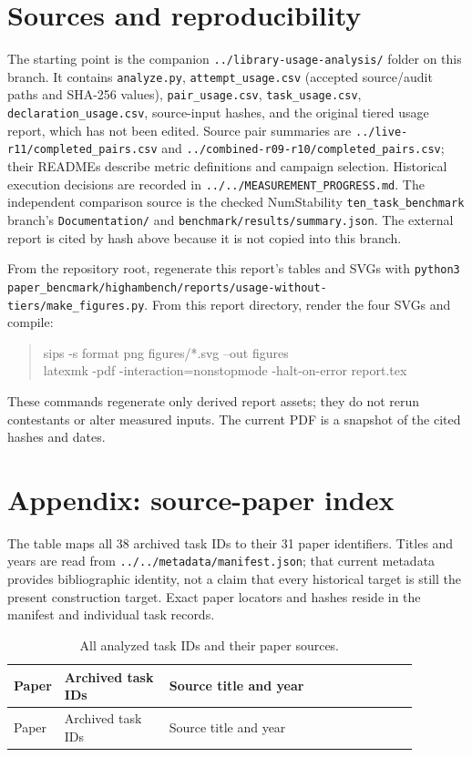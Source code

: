 \documentclass[10pt]{article}
\renewcommand{\arraystretch}{1.12}
\newcommand{\pathref}[1]{\nolinkurl{#1}}
\begin{document}
\section{Sources and reproducibility}
The starting point is the companion \pathref{../library-usage-analysis/} folder on this branch. It contains \pathref{analyze.py}, \pathref{attempt_usage.csv} (accepted source/audit paths and SHA-256 values), \pathref{pair_usage.csv}, \pathref{task_usage.csv}, \pathref{declaration_usage.csv}, source-input hashes, and the original tiered usage report, which has not been edited. Source pair summaries are \pathref{../live-r11/completed_pairs.csv} and \pathref{../combined-r09-r10/completed_pairs.csv}; their READMEs describe metric definitions and campaign selection. Historical execution decisions are recorded in \pathref{../../MEASUREMENT_PROGRESS.md}. The independent comparison source is the checked NumStability \texttt{ten\_task\_benchmark} branch's \pathref{Documentation/} and \pathref{benchmark/results/summary.json}. The external report is cited by hash above because it is not copied into this branch.

From the repository root, regenerate this report's tables and SVGs with \texttt{python3 paper\_bencmark/highambench/reports/usage-without-tiers/make\_figures.py}. From this report directory, render the four SVGs and compile:
\begin{quote}\footnotesize\ttfamily
sips -s format png figures/*.svg --out figures\\
latexmk -pdf -interaction=nonstopmode -halt-on-error report.tex
\end{quote}
These commands regenerate only derived report assets; they do not rerun contestants or alter measured inputs. The current PDF is a snapshot of the cited hashes and dates.

\clearpage
\section*{Appendix: source-paper index}
The table maps all 38 archived task IDs to their 31 paper identifiers. Titles and years are read from \pathref{../../metadata/manifest.json}; that current metadata provides bibliographic identity, not a claim that every historical target is still the present construction target. Exact paper locators and hashes reside in the manifest and individual task records.

\footnotesize\renewcommand{\arraystretch}{1.02}
\begin{longtable}{@{}lp{0.26\linewidth}p{0.62\linewidth}@{}}
\caption{All analyzed task IDs and their paper sources.}\\
\toprule
Paper & Archived task IDs & Source title and year \\\midrule
\endfirsthead
\toprule
Paper & Archived task IDs & Source title and year \\\midrule
\endhead

\end{longtable}
\normalsize\renewcommand{\arraystretch}{1.12}
\end{document}
